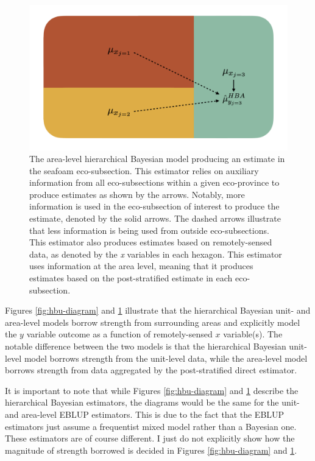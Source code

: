 \documentclass[12pt,twoside]{reedthesis}
\begin{document}
\clearpage
\begin{figure}

{\centering \includegraphics[width=1\linewidth]{figure/hba-diagram} 

}

\caption[The area-level hierarchical Bayesian model]{The area-level hierarchical Bayesian model producing an estimate in the seafoam eco-subsection. This estimator relies on auxiliary information from all eco-subsections within a given eco-province to produce estimates as shown by the arrows. Notably, more information is used in the eco-subsection of interest to produce the estimate, denoted by the solid arrows. The dashed arrows illustrate that less information is being used from outside eco-subsections. This estimator also produces estimates based on remotely-sensed data, as denoted by the \textit{x} variables in each hexagon. This estimator uses information at the area level, meaning that it produces estimates based on the post-stratified estimate in each eco-subsection.}\label{fig:hba-diagram}
\end{figure}
Figures \ref{fig:hbu-diagram} and \ref{fig:hba-diagram} illustrate that the hierarchical Bayesian unit- and area-level models borrow strength from surrounding areas and explicitly model the \(y\) variable outcome as a function of remotely-sensed \(x\) variable(s). The notable difference between the two models is that the hierarchical Bayesian unit-level model borrows strength from the unit-level data, while the area-level model borrows strength from data aggregated by the post-stratified direct estimator.

It is important to note that while Figures \ref{fig:hbu-diagram} and \ref{fig:hba-diagram} describe the hierarchical Bayesian estimators, the diagrams would be the same for the unit- and area-level EBLUP estimators. This is due to the fact that the EBLUP estimators just assume a frequentist mixed model rather than a Bayesian one. These estimators are of course different. I just do not explicitly show how the magnitude of strength borrowed is decided in Figures \ref{fig:hbu-diagram} and \ref{fig:hba-diagram}.
\end{document}
